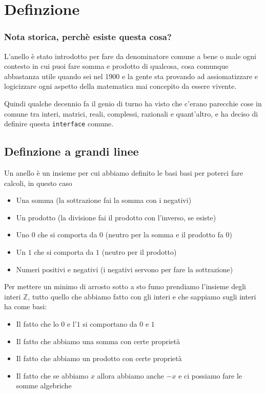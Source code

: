 \documentclass[11pt]{article}
\date{\today}
\title{}
\begin{document}
\tableofcontents

\section{Definzione}
\label{sec:orgf982fa7}
\subsubsection{Nota storica, perchè esiste questa cosa?}
\label{sec:orgbda9592}
L'anello è stato introdotto per fare da denominatore comune a bene o
male ogni contesto in cui puoi fare somma e prodotto di qualcosa, cosa
comunque abbastanza utile quando sei nel 1900 e la gente sta provando
ad assiomatizzare e logicizzare ogni aspetto della matematica mai
concepito da essere vivente.

Quindi qualche decennio fa il genio di turno ha visto che c'erano
parecchie cose in comune tra interi, matrici, reali, complessi,
razionali e quant'altro, e ha deciso di definire questa \texttt{interface}
comune.

\subsection{Definzione a grandi linee}
\label{sec:org6398d93}
Un anello è un insieme per cui abbiamo definito le basi basi per
poterci fare calcoli, in questo caso
\begin{itemize}
\item Una somma (la sottrazione fai la somma con i negativi)
\item Un prodotto (la divisione fai il prodotto con l'inverso, se esiste)
\item Uno \(0\) che si comporta da \(0\)
(neutro per la somma e il prodotto fa \(0\))
\item Un \(1\) che si comporta da \(1\) (neutro per il prodotto)
\item Numeri positivi e negativi (i negativi servono per fare la sottrazione)
\end{itemize}

Per mettere un minimo di arrosto sotto a sto fumo prendiamo l'insieme
degli interi \(\mathbb{Z}\), tutto quello che abbiamo fatto con gli
interi e che sappiamo sugli interi ha come basi:
\begin{itemize}
\item Il fatto che lo \(0\) e l'\(1\) si comportano da \(0\) e \(1\)
\item Il fatto che abbiamo una somma con certe proprietà
\item Il fatto che abbiamo un prodotto con certe proprietà
\item Il fatto che se abbiamo \(x\) allora abbiamo anche \(-x\) e ci possiamo
fare le somme algebriche
\end{itemize}
\end{document}

